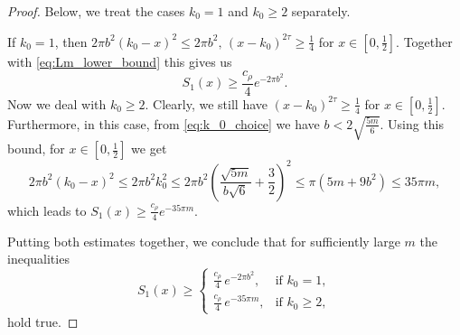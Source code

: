 \documentclass[11pt]{amsart}
\numberwithin{equation}{section}
\begin{document}
\begin{proof}
Below, we treat the cases $k_0 = 1$ and $k_0 \geq 2$ separately. 

If $k_0 = 1$, then 
$2\pi b^2 (k_0-x)^2  \leq 2\pi b^2, \, (x-k_0)^{2\tau} \geq \frac{1}{4}$ for $x\in[0,\frac{1}{2}]$.
Together with \eqref{eq:Lm_lower_bound} this gives us 
\begin{equation}
    S_1(x) \geq \frac{c_{\rho}}{4}  e^{-2\pi b^2}.
\end{equation}
Now we deal with $k_0\geq 2$. Clearly, we still have $(x-k_0)^{2\tau}\geq\frac{1}{4}$ for $x\in[0,\frac{1}{2}]$. Furthermore, in this case, from \eqref{eq:k_0_choice} we have $b < 2\sqrt{\frac{5m}{6}}.$
Using this bound, for $x\in[0,\frac{1}{2}]$ we get
\begin{equation}\label{eq:k_0_upper_bound}
   2\pi b^2 (k_0-x)^2 \leq 2\pi b^2 k_0^2 \leq 2\pi b^2 \left(\frac{\sqrt{5m}}{b\sqrt{6}}+\frac{3}{2}\right)^2\leq \pi (5m+9 b^2) \leq 35\pi m, 
\end{equation}
which leads to $S_1(x) \geq \frac{c_{\rho}}{4} e^{-35 \pi m}.$

Putting both estimates together, we conclude that for sufficiently large $m$ the inequalities
\begin{equation}\label{eq:S_1_lower_bound}
    S_1(x)\geq
    \begin{cases}
         \frac{c_{\rho}}{4}\,e^{-2\pi b^2},
        & \text{if } k_0=1,\\[1ex]
         \frac{c_{\rho}}{4}\,e^{-35\pi m},
        & \text{if } k_0\geq2,
    \end{cases}
\end{equation}
hold true.


\end{proof}
\end{document}
